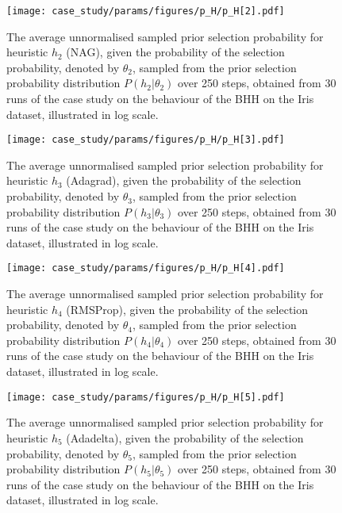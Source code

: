 \begin{figure}[htpb]
	\centering
	\texttt{[image: case\_study/params/figures/p\_H/p\_H[2].pdf]}
	\caption{The average unnormalised sampled prior selection probability for heuristic $h_{2}$ (\acs{NAG}), given the probability of the selection probability, denoted by $\theta_{2}$, sampled from the prior selection probability distribution $P(h_{2} \vert \theta_{2})$ over 250 steps, obtained from 30 runs of the case study on the behaviour of the \acs{BHH} on the Iris dataset, illustrated in log scale.}
	\label{fig:app:case_study_additional:p_H:2}
\end{figure}

\begin{figure}[htpb]
	\centering
	\texttt{[image: case\_study/params/figures/p\_H/p\_H[3].pdf]}
	\caption{The average unnormalised sampled prior selection probability for heuristic $h_{3}$ (\acs{Adagrad}), given the probability of the selection probability, denoted by $\theta_{3}$, sampled from the prior selection probability distribution $P(h_{3} \vert \theta_{3})$ over 250 steps, obtained from 30 runs of the case study on the behaviour of the \acs{BHH} on the Iris dataset, illustrated in log scale.}
	\label{fig:app:case_study_additional:p_H:3}
\end{figure}

\begin{figure}[htpb]
	\centering
	\texttt{[image: case\_study/params/figures/p\_H/p\_H[4].pdf]}
	\caption{The average unnormalised sampled prior selection probability for heuristic $h_{4}$ (\acs{RMSProp}), given the probability of the selection probability, denoted by $\theta_{4}$, sampled from the prior selection probability distribution $P(h_{4} \vert \theta_{4})$ over 250 steps, obtained from 30 runs of the case study on the behaviour of the \acs{BHH} on the Iris dataset, illustrated in log scale.}
	\label{fig:app:case_study_additional:p_H:4}
\end{figure}

\begin{figure}[htpb]
	\centering
	\texttt{[image: case\_study/params/figures/p\_H/p\_H[5].pdf]}
	\caption{The average unnormalised sampled prior selection probability for heuristic $h_{5}$ (\acs{Adadelta}), given the probability of the selection probability, denoted by $\theta_{5}$, sampled from the prior selection probability distribution $P(h_{5} \vert \theta_{5})$ over 250 steps, obtained from 30 runs of the case study on the behaviour of the \acs{BHH} on the Iris dataset, illustrated in log scale.}
	\label{fig:app:case_study_additional:p_H:5}
\end{figure}

